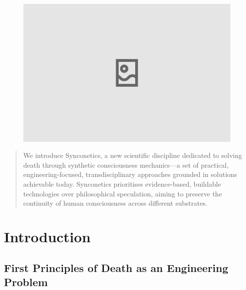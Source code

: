 \documentclass[10pt]{article}
\begin{document}
\begin{sloppypar}

  \begin{figure}[ht]
    \centering
    \includegraphics[width=\textwidth]{figures/cover.png}
    \label{fig:cover}
  \end{figure}
  \newpage


  \begin{abstract}
    We introduce Synconetics, a new scientific discipline dedicated to solving death through synthetic consciousness mechanics—a set of practical, engineering-focused, transdisciplinary approaches grounded in solutions achievable today. Synconetics prioritises evidence-based, buildable technologies over philosophical speculation, aiming to preserve the continuity of human consciousness across different substrates.
  \end{abstract}

  \pagebreak
  \tableofcontents
  \pagebreak
  \listoffigures
  \pagebreak
  \listoftables
  \pagebreak
  \lstlistoflistings
  \pagebreak


  \section{Introduction}
  \label{sec:introduction}

  \subsection{First Principles of Death as an Engineering Problem}
  \label{sec:first-principles}


\end{sloppypar}
\end{document}
